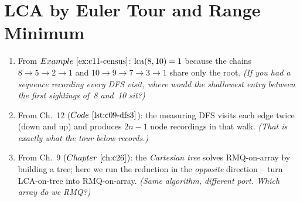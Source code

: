 \section{LCA by Euler Tour and Range Minimum}\label{sec:c11-euler}

\begin{previouslybox}
\begin{enumerate}[nosep, leftmargin=1.8em]
  \item From \(\exref{c11-census}\): \(\operatorname{lca}(8,10) = 1\) because the
        chains \(8\to5\to2\to1\) and \(10\to9\to7\to3\to1\) share only
        the root.  \emph{(If you had a sequence recording every DFS
        visit, where would the shallowest entry between the first
        sightings of~8 and~10 sit?)}
  \item From Ch.~12 (\(\coderef{c09-dfs3}\)): the measuring DFS visits
        each edge twice (down and up) and produces \(2n-1\) node
        recordings in that walk.  \emph{(That is exactly what the tour
        below records.)}
  \item From Ch.~9 (\(\chref{c26}\)): the \emph{Cartesian tree} solves
        RMQ-on-array by building a tree; here we run the reduction in
        the \emph{opposite} direction -- turn LCA-on-tree into RMQ-on-array.
        \emph{(Same algorithm, different port.  Which array do we RMQ?)}
\end{enumerate}
\end{previouslybox}

